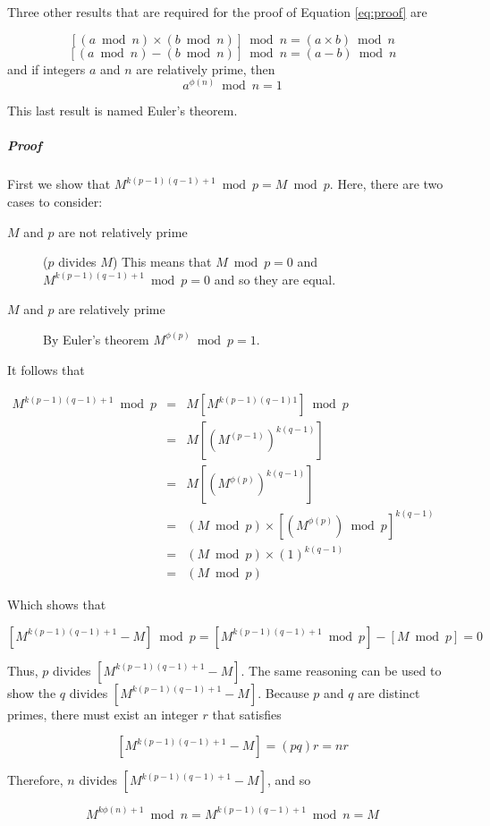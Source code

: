 \documentclass[a4paper,10pt]{report}
\begin{document}
Three other results that are required for the proof of Equation \ref{eq:proof} are

\[ [(a\bmod n)\times(b \bmod n)] \bmod n = (a \times b) \bmod n \]
\[ [(a\bmod n) - (b \bmod n)] \bmod n = (a - b) \bmod n \]
and if integers $a$ and $n$ are relatively prime, then
\[a^{\phi(n)} \bmod n = 1 \]

This last result is named Euler's theorem. 

\subparagraph{Proof}

First we show that $M^{k(p-1)(q-1) + 1} \bmod p = M \bmod p$. Here, there are two cases to consider:

\begin{description}
 \item[$M$ and $p$ are not relatively prime] ($p$ divides $M$) This means that $M \bmod p = 0$ and $M^{k(p-1)(q-1) + 1} \bmod p = 0$ and so they are equal. 
 \item[$M$ and $p$ are relatively prime] By Euler's theorem $M^{\phi(p)} \bmod p = 1$.
\end{description}

It follows that

\begin{center}
$\begin{array}{lcl} M^{k(p-1)(q-1) + 1} \bmod p & = & M[M^{k(p-1)(q-1)1}] \bmod p  \\  
						& = & M[(M^{(p-1)})^{k(q-1)}] \\
						& = & M[(M^{\phi(p)})^{k(q-1)}]  \\
						& = & (M \bmod p) \times [(M^{\phi(p)}) \bmod p]^{k(q-1)} \\
						& = & (M \bmod p) \times (1)^{k(q-1)} \\
						& = & (M \bmod p) 
\end{array}$
\end{center}

Which shows that 

\[ [M^{k(p-1)(q-1) + 1} - M]\bmod p = [M^{k(p-1)(q-1) + 1} \bmod p] - [M \bmod p] = 0 \]

Thus, $p$ divides $[M^{k(p-1)(q-1) + 1} - M]$. The same reasoning can be used to show the $q$ divides $[M^{k(p-1)(q-1) + 1} - M]$. Because $p$ and $q$ are distinct primes, there must exist an integer $r$ that satisfies 

\[ [M^{k(p-1)(q-1) + 1} - M] = (pq)r = nr \]

Therefore, $n$ divides $[M^{k(p-1)(q-1) + 1} - M]$, and so

\[ M^{k\phi(n) + 1} \bmod n = M^{k(p-1)(q-1) + 1} \bmod n = M \]
\end{document}

